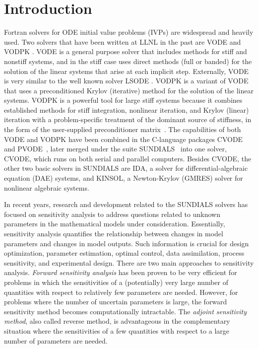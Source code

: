 \section{Introduction}\label{s:introduction}

Fortran solvers for ODE initial value problems (IVPs) are widespread and heavily used. 
Two solvers that have been written at LLNL in the past are VODE \cite{BBH:89} 
and VODPK \cite{Byr:92}.
%
VODE is a general purpose solver that includes methods for stiff
and nonstiff systems, and in the stiff case uses direct methods (full or
banded) for the solution of the linear systems that arise at each implicit
step. Externally, VODE is very similar to the well known solver
LSODE \cite{RaHi:94}. 
VODPK is a variant of VODE that uses a preconditioned Krylov 
(iterative) method for the solution of the linear systems. VODPK is a powerful 
tool for large stiff systems because it combines established methods for stiff 
integration, nonlinear iteration, and Krylov (linear) iteration with a problem-specific
treatment of the dominant source of stiffness, in the form of the user-supplied
preconditioner matrix~\cite{BrHi:89}.
%
The capabilities of both VODE and VODPK have been combined in the C-language 
packages CVODE~\cite{CoHi:96} and PVODE~\cite{ByHi:99}, later merged under the
suite SUNDIALS~\cite{HBGLSSW:03} into one solver, CVODE, which runs on both
serial and parallel computers. Besides CVODE, the other two basic solvers in SUNDIALS
are IDA, a solver for differential-algebraic equation (DAE) systems, and
KINSOL, a Newton-Krylov (GMRES) solver for nonlinear algebraic systems.

In recent years, research and development related to the SUNDIALS solvers has
focused on sensitivity analysis to address questions related to unknown 
parameters in the mathematical models under consideration.
Essentially, sensitivity analysis quantifies the relationship between
changes in model parameters and changes in model outputs. Such information 
is crucial for design optimization, parameter estimation, optimal control, data
assimilation, process sensitivity, and experimental design.
%
There are two main approaches to sensitivity analysis.
{\em Forward sensitivity analysis} has been proven to be very efficient for
problems in which the sensitivities of a (potentially) very large
number of quantities with respect to relatively few parameters are
needed.  However, for problems where the number of uncertain
parameters is large, the forward sensitivity method becomes
computationally intractable.  The {\em adjoint sensitivity method}, also called
reverse method, is advantageous in the complementary situation where the sensitivities of
a few quantities with respect to a large number of parameters are needed.

